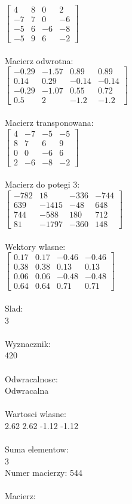 \documentclass[a4paper,12pt]{article}
\begin{document}
$\begin{bmatrix} 4&8&0&2\\-7&7&0&-6\\-5&6&-6&-8\\-5&9&6&-2 \end{bmatrix}$
\\
\\
Macierz odwrotna:\\

$\begin{bmatrix} -0.29&-1.57&0.89&0.89\\0.14&0.29&-0.14&-0.14\\-0.29&-1.07&0.55&0.72\\0.5&2&-1.2&-1.2 \end{bmatrix}$
\\
\\
Macierz transponowana:\\

$\begin{bmatrix} 4&-7&-5&-5\\8&7&6&9\\0&0&-6&6\\2&-6&-8&-2 \end{bmatrix}$
\\
\\
Macierz do potegi 3:\\

$\begin{bmatrix} -782&18&-336&-744\\639&-1415&-48&648\\744&-588&180&712\\81&-1797&-360&148 \end{bmatrix}$
\\
\\
Wektory wlasne:\\

$\begin{bmatrix} 0.17&0.17&-0.46&-0.46\\0.38&0.38&0.13&0.13\\0.06&0.06&-0.48&-0.48\\0.64&0.64&0.71&0.71 \end{bmatrix}$
\\
\\
Slad:\\
3
\\
\\
Wyznacznik:\\
420
\\
\\
Odwracalnosc:\\
Odwracalna
\\
\\
Wartosci wlasne:\\
2.62 2.62 -1.12 -1.12
\\
\\
Suma elementow:\\
3
\\
\newpage
Numer macierzy:
544
\\
\\
Macierz:\\
\end{document}
